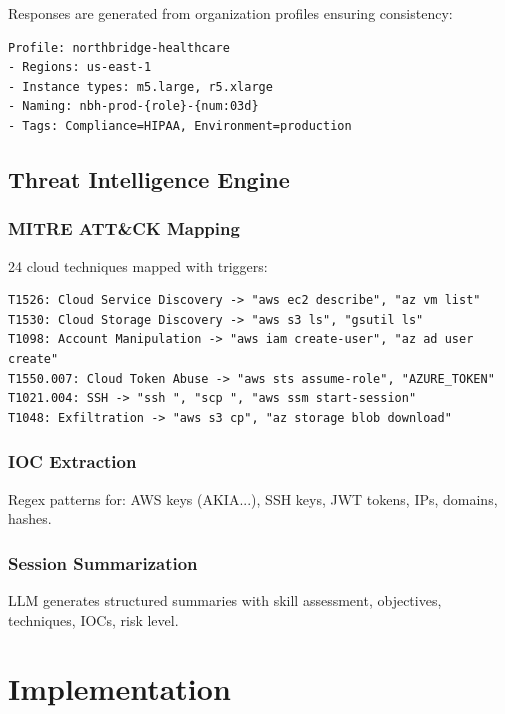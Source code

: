 \documentclass[10pt,conference]{IEEEtran}
\begin{document}
Responses are generated from organization profiles ensuring consistency:
\begin{verbatim}
Profile: northbridge-healthcare
- Regions: us-east-1
- Instance types: m5.large, r5.xlarge
- Naming: nbh-prod-{role}-{num:03d}
- Tags: Compliance=HIPAA, Environment=production
\end{verbatim}

\subsection{Threat Intelligence Engine}
\label{sec:threatintel}

\subsubsection{MITRE ATT&CK Mapping}
24 cloud techniques mapped with triggers:
\begin{verbatim}
T1526: Cloud Service Discovery -> "aws ec2 describe", "az vm list"
T1530: Cloud Storage Discovery -> "aws s3 ls", "gsutil ls"
T1098: Account Manipulation -> "aws iam create-user", "az ad user create"
T1550.007: Cloud Token Abuse -> "aws sts assume-role", "AZURE_TOKEN"
T1021.004: SSH -> "ssh ", "scp ", "aws ssm start-session"
T1048: Exfiltration -> "aws s3 cp", "az storage blob download"
\end{verbatim}

\subsubsection{IOC Extraction}
Regex patterns for: AWS keys (AKIA...), SSH keys, JWT tokens, IPs, domains, hashes.

\subsubsection{Session Summarization}
LLM generates structured summaries with skill assessment, objectives, techniques, IOCs, risk level.

\section{Implementation}
\label{sec:impl}
\end{document}
